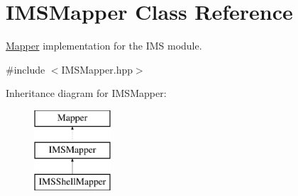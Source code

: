 \hypertarget{classIMSMapper}{
\section{IMSMapper Class Reference}
\label{classIMSMapper}
}


\hyperlink{classMapper}{Mapper} implementation for the IMS module.  




{\ttfamily \#include $<$IMSMapper.hpp$>$}

Inheritance diagram for IMSMapper:\begin{figure}[H]
\begin{center}
\leavevmode
\includegraphics[height=3.000000cm]{classIMSMapper}
\end{center}
\end{figure}
